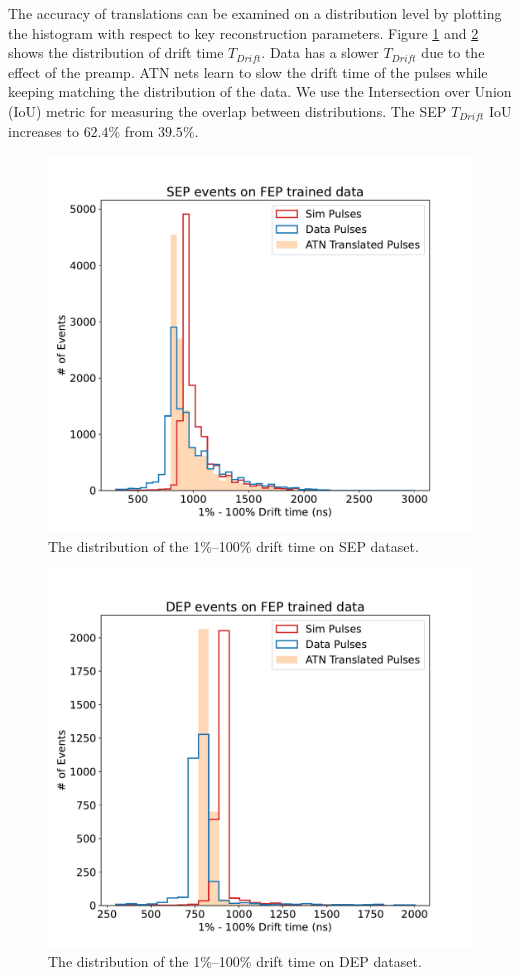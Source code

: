  The accuracy of translations can be examined on a distribution level by plotting the histogram with respect to key reconstruction parameters. Figure \ref{fig:drift_times_sep} and \ref{fig:drift_times_dep} shows the distribution of drift time $T_{Drift}$. Data has a slower $T_{Drift}$ due to the effect of the preamp. ATN nets learn to slow the drift time of the pulses while keeping matching the distribution of the data. We use the Intersection over Union (IoU) metric for measuring the overlap between distributions. The SEP $T_{Drift}$ IoU increases to $62.4\%$ from $39.5\%$.
 
\begin{figure}%
\centering
\includegraphics[width=0.8\linewidth,trim={0pc 0pc 0pc 5.5pc},clip]{ch8/figs/sep_drift_time.pdf}
\caption{The distribution of the 1\%–100\% drift time on SEP dataset.}
\label{fig:drift_times_sep}
\end{figure}

\begin{figure}%
\centering
\includegraphics[width=0.8\linewidth,trim={0pc 0pc 0pc 5.5pc},clip]{ch8/figs/dep_drift_time.pdf}
\caption{The distribution of the 1\%–100\% drift time on DEP dataset.}
\label{fig:drift_times_dep}
\end{figure}


